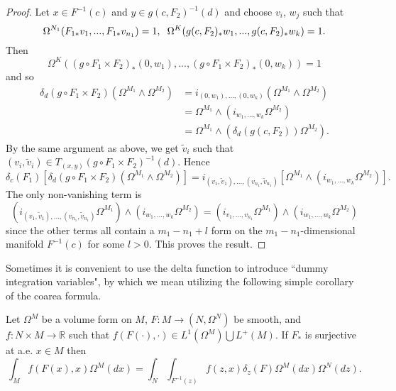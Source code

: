 \begin{proof}
  Let $x\in F^{-1}(c)$ and $y\in  g(c,F_2)^{-1}(d)$ and choose $v_i$, $w_j$ such that
\begin{equation}
\Omega^{N_1}(F_{1*}v_1,...,F_{1*}v_{n_1})=1, \hspace{2mm} \Omega^K(g(c,F_2)_*w_1,...,g(c,F_2)_*w_k)=1.
\end{equation}
Then 
\begin{equation}
\Omega^K((g\circ F_1\times F_2)_*(0,w_1),...,(g\circ F_1\times F_2)_*(0,w_k))=1
\end{equation}
and so 
\begin{align}
\delta_d( g\circ F_1\times F_2)\left(\Omega^{M_1}\wedge\Omega^{M_2}\right)&=i_{(0,w_1),...,(0,w_k)}\left(\Omega^{M_1}\wedge\Omega^{M_2}\right)\\
&=\Omega^{M_1}\wedge\left(i_{w_1,...,w_k}\Omega^{M_2}\right)\\
&=\Omega^{M_1}\wedge\left(\delta_d(g(c,F_2))\Omega^{M_2}\right).
\end{align}
By the same argument as above, we get $\tilde{v}_i$ such that $(v_i,\tilde{v}_i)\in T_{(x,y)} (g\circ F_1\times F_2)^{-1}(d)$.  Hence
\begin{equation}
\delta_c(F_1)\left[\delta_d( g\circ F_1\times F_2)\left(\Omega^{M_1}\wedge\Omega^{M_2}\right)\right]=i_{(v_1,\tilde{v}_1),...,(v_{n_1},\tilde{v}_{n_1})}\left[\Omega^{M_1}\wedge\left(i_{w_1,...,w_k}\Omega^{M_2}\right)\right].
\end{equation}
The only non-vanishing term is
\begin{equation}
\left(i_{(v_1,\tilde{v}_1),...,(v_{n_1},\tilde{v}_{n_1})}\Omega^{M_1}\right)\wedge\left(i_{w_1,...,w_k}\Omega^{M_2}\right)=\left(i_{v_1,...,v_{n_1}}\Omega^{M_1}\right)\wedge\left(i_{w_1,...,w_k}\Omega^{M_2}\right)
\end{equation}
since the other terms all contain a $m_1-n_1+l$ form on the $m_1-n_1$-dimensional manifold $F^{-1}(c)$ for some $l>0$.  This proves the result.
\end{proof}

Sometimes it is convenient to use the delta function to introduce ``dummy integration variables", by which we mean utilizing the following simple corollary of the coarea formula.
\begin{corollary}\label{dummy_int}
Let $\Omega^M$ be a volume form on $M$, $F:M\rightarrow (N,\Omega^N)$ be smooth, and $f:N\times M\rightarrow \mathbb{R}$  such that $f(F(\cdot),\cdot)\in L^1(\Omega^M)\bigcup L^+(M)$.  If $F_*$ is surjective at a.e. $x\in M$ then
\begin{equation}
\int_M f(F(x),x)\Omega^M(dx)=\int_N\int_{F^{-1}(z)} f(z,x)\delta_z(F)\Omega^M(dx) \Omega^N(dz).
\end{equation}
\end{corollary}





